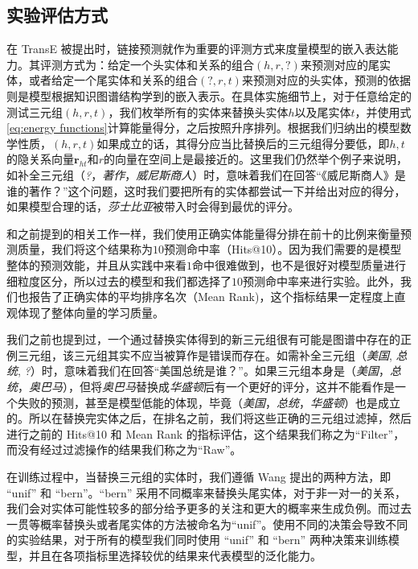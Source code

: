 \subsection{实验评估方式}
在 TransE \cite{bordes2013translating} 被提出时，链接预测就作为重要的评测方式来度量模型的嵌入表达能力。其评测方式为：给定一个头实体和关系的组合$(h, r, ?)$来预测对应的尾实体，或者给定一个尾实体和关系的组合$(?, r ,t)$来预测对应的头实体，预测的依据则是模型根据知识图谱结构学到的嵌入表示。在具体实施细节上，对于任意给定的测试三元组$(h, r, t)$，我们枚举所有的实体来替换头实体$h$以及尾实体$t$，并使用式\ref{eq:energy functions}计算能量得分，之后按照升序排列。根据我们归纳出的模型数学性质，$(h, r, t)$如果成立的话，其得分应当比替换后的三元组得分要低，即$h, t$的隐关系向量$\textbf{r}_{ht}$和$r$的向量在空间上是最接近的。这里我们仍然举个例子来说明，如补全三元组（\emph{?}，\emph{著作}，\emph{威尼斯商人}）时，意味着我们在回答``《威尼斯商人》是谁的著作？''这个问题，这时我们要把所有的实体都尝试一下并给出对应的得分，如果模型合理的话，\emph{莎士比亚}被带入时会得到最优的评分。

和之前提到的相关工作一样，我们使用正确实体能量得分排在前十的比例来衡量预测质量，我们将这个结果称为$10$预测命中率（Hits@10）。因为我们需要的是模型整体的预测效能，并且从实践中来看$1$命中很难做到，也不是很好对模型质量进行细粒度区分，所以过去的模型和我们都选择了$10$预测命中率来进行实验。此外，我们也报告了正确实体的平均排序名次（Mean Rank)，这个指标结果一定程度上直观体现了整体向量的学习质量。

我们之前也提到过，一个通过替换实体得到的新三元组很有可能是图谱中存在的正例三元组，该三元组其实不应当被算作是错误而存在。如需补全三元组（\emph{美国}, \emph{总统}, \emph{?}）时，意味着我们在回答``美国总统是谁？''。如果三元组本身是（\emph{美国}，\emph{总统}，\emph{奥巴马}），但将\emph{奥巴马}替换成\emph{华盛顿}后有一个更好的评分，这并不能看作是一个失败的预测，甚至是模型低能的体现，毕竟（\emph{美国}，\emph{总统}，\emph{华盛顿}）也是成立的。所以在替换完实体之后，在排名之前，我们将这些正确的三元组过滤掉，然后进行之前的 Hits@10 和 Mean Rank 的指标评估，这个结果我们称之为``Filter''，而没有经过过滤操作的结果我们称之为``Raw''。

在训练过程中，当替换三元组的实体时，我们遵循 Wang \cite{wang2014transh} 提出的两种方法，即 ``unif'' 和 ``bern''。``bern'' 采用不同概率来替换头尾实体，对于非一对一的关系，我们会对实体可能性较多的部分给予更多的关注和更大的概率来生成负例。而过去一贯等概率替换头或者尾实体的方法被命名为``unif''。使用不同的决策会导致不同的实验结果，对于所有的模型我们同时使用 ``unif'' 和 ``bern'' 两种决策来训练模型，并且在各项指标里选择较优的结果来代表模型的泛化能力。

